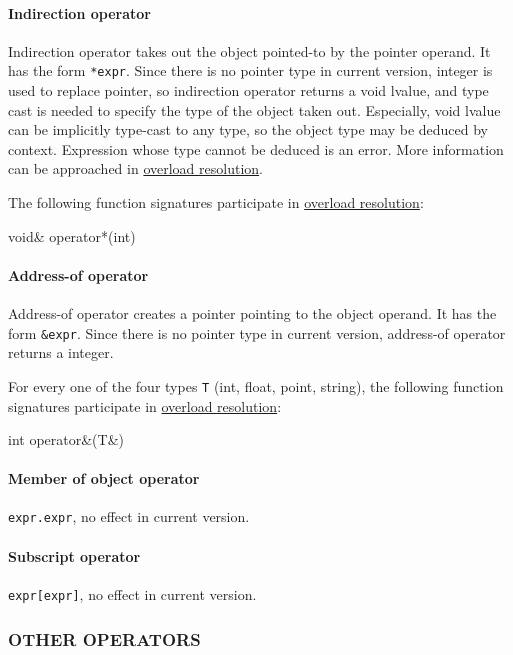 \documentclass{article}
\begin{document}
\paragraph{Indirection operator} Indirection operator takes out the object pointed-to by the pointer operand. It has the form \verb|*expr|. Since there is no pointer type in current version, integer is used to replace pointer, so indirection operator returns a void lvalue, and type cast is needed to specify the type of the object taken out. Especially, void lvalue can be implicitly type-cast to any type, so the object type may be deduced by context. Expression whose type cannot be deduced is an error. More information can be approached in \hyperref[chongzai]{overload resolution}.

The following function signatures participate in \hyperref[chongzai]{overload resolution}:
\begin{MUAvbt}
void& operator*(int)
\end{MUAvbt}

\paragraph{Address-of operator} Address-of operator creates a pointer pointing to the object operand. It has the form \verb|&expr|. Since there is no pointer type in current version, address-of operator returns a integer.

For every one of the four types \verb|T| (int, float, point, string), the following function signatures participate in \hyperref[chongzai]{overload resolution}:
\begin{MUAvbt}
int operator&(T&)
\end{MUAvbt}

\paragraph{Member of object operator} \verb|expr.expr|, no effect in current version.

\paragraph{Subscript operator} \verb|expr[expr]|, no effect in current version.

\subsubsection{OTHER OPERATORS}
\label{qita}
\end{document}
